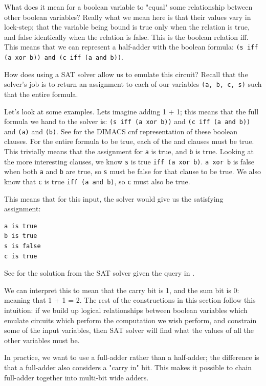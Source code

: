 What does it mean for a boolean variable to "equal" some relationship between other boolean variables? Really what we mean here is that their values vary in lock-step; that the variable being bound is true only when the relation is true, and false identically when the relation is false. This is the boolean relation iff. This means that we can represent a half-adder with the boolean formula:
\texttt{(s iff (a xor b)) and (c iff (a and b))}.

How does using a SAT solver allow us to emulate this circuit? Recall that the solver's job is to return an assignment to each of our variables \texttt{(a, b, c, s)} such that the entire formula.

Let's look at some examples. Lets imagine adding 1 + 1; this means that the full formula we hand to the solver is:
\texttt{(s iff (a xor b))} and \texttt{(c iff (a and b))} and \texttt{(a)} and \texttt{(b)}. See  for the DIMACS cnf representation of these boolean clauses.
For the entire formula to be true, each of the and clauses must be true. This trivially means that the assignment for \texttt{a} is true, and \texttt{b} is true. Looking at the more interesting clauses, we know \texttt{s} is true \texttt{iff (a xor b)}. \texttt{a xor b} is false when both \texttt{a} and \texttt{b} are true, so \texttt{s} must be false for that clause to be true. We also know that \texttt{c} is true \texttt{iff (a and b)}, so \texttt{c} must also be true.

This means that for this input, the solver would give us the satisfying assignment:
\begin{verbatim}
a is true
b is true
s is false
c is true
\end{verbatim}

See  for the solution from the SAT solver given the query in .

We can interpret this to mean that the carry bit is 1, and the sum bit is 0: meaning that 1 + 1 = 2. The rest of the constructions in this section follow this intuition: if we build up logical relationships between boolean variables which emulate circuits which perform the computation we wish perform, and constrain some of the input variables, then SAT solver will find what the values of all the other variables must be.

In practice, we want to use a full-adder rather than a half-adder; the difference is that a full-adder also considers a "carry in" bit. This makes it possible to chain full-adder together into multi-bit wide adders.


